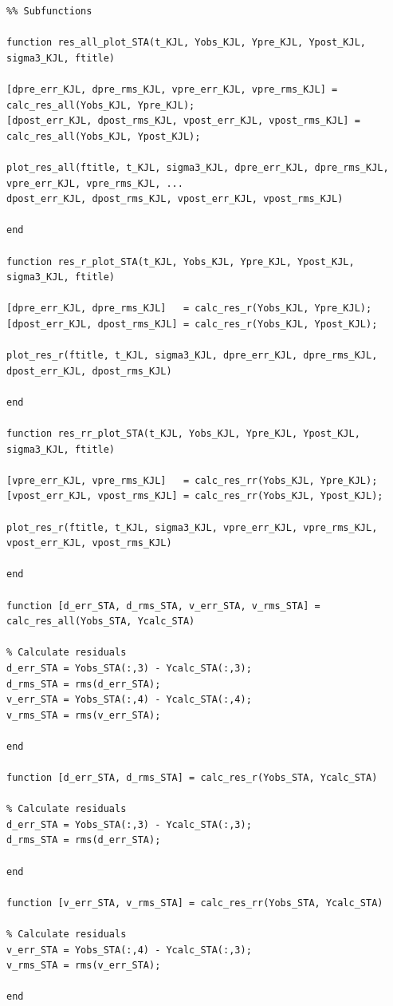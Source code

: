 \documentclass[conf]{new-aiaa}
\begin{document}
\begin{lstlisting}
%% Subfunctions 

function res_all_plot_STA(t_KJL, Yobs_KJL, Ypre_KJL, Ypost_KJL, sigma3_KJL, ftitle)

[dpre_err_KJL, dpre_rms_KJL, vpre_err_KJL, vpre_rms_KJL] = calc_res_all(Yobs_KJL, Ypre_KJL); 
[dpost_err_KJL, dpost_rms_KJL, vpost_err_KJL, vpost_rms_KJL] = calc_res_all(Yobs_KJL, Ypost_KJL); 

plot_res_all(ftitle, t_KJL, sigma3_KJL, dpre_err_KJL, dpre_rms_KJL, vpre_err_KJL, vpre_rms_KJL, ... 
dpost_err_KJL, dpost_rms_KJL, vpost_err_KJL, vpost_rms_KJL)

end 

function res_r_plot_STA(t_KJL, Yobs_KJL, Ypre_KJL, Ypost_KJL, sigma3_KJL, ftitle)

[dpre_err_KJL, dpre_rms_KJL]   = calc_res_r(Yobs_KJL, Ypre_KJL); 
[dpost_err_KJL, dpost_rms_KJL] = calc_res_r(Yobs_KJL, Ypost_KJL); 

plot_res_r(ftitle, t_KJL, sigma3_KJL, dpre_err_KJL, dpre_rms_KJL, dpost_err_KJL, dpost_rms_KJL)

end 

function res_rr_plot_STA(t_KJL, Yobs_KJL, Ypre_KJL, Ypost_KJL, sigma3_KJL, ftitle)

[vpre_err_KJL, vpre_rms_KJL]   = calc_res_rr(Yobs_KJL, Ypre_KJL); 
[vpost_err_KJL, vpost_rms_KJL] = calc_res_rr(Yobs_KJL, Ypost_KJL); 

plot_res_r(ftitle, t_KJL, sigma3_KJL, vpre_err_KJL, vpre_rms_KJL, vpost_err_KJL, vpost_rms_KJL)

end 

function [d_err_STA, d_rms_STA, v_err_STA, v_rms_STA] = calc_res_all(Yobs_STA, Ycalc_STA)

% Calculate residuals 
d_err_STA = Yobs_STA(:,3) - Ycalc_STA(:,3); 
d_rms_STA = rms(d_err_STA); 
v_err_STA = Yobs_STA(:,4) - Ycalc_STA(:,4); 
v_rms_STA = rms(v_err_STA); 

end 

function [d_err_STA, d_rms_STA] = calc_res_r(Yobs_STA, Ycalc_STA)

% Calculate residuals 
d_err_STA = Yobs_STA(:,3) - Ycalc_STA(:,3); 
d_rms_STA = rms(d_err_STA); 

end 

function [v_err_STA, v_rms_STA] = calc_res_rr(Yobs_STA, Ycalc_STA)

% Calculate residuals 
v_err_STA = Yobs_STA(:,4) - Ycalc_STA(:,3); 
v_rms_STA = rms(v_err_STA); 

end 


\end{lstlisting}
\end{document}
